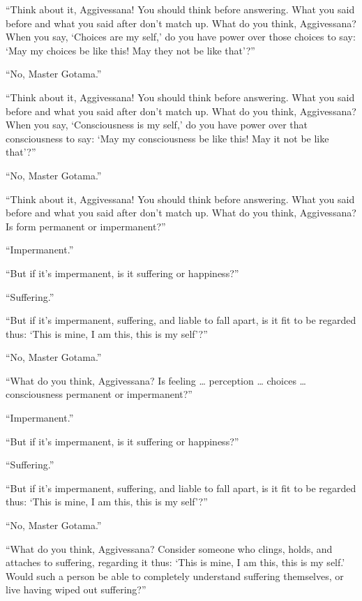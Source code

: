 \documentclass[12pt,openany]{book}%
\begin{document}
“Think about it, Aggivessana! You should think before answering. What you said before and what you said after don’t match up. What do you think, Aggivessana? When you say, ‘Choices are my self,’ do you have power over those choices to say: ‘May my choices be like this! May they not be like that’?” 

“No, Master Gotama.” 

“Think about it, Aggivessana! You should think before answering. What you said before and what you said after don’t match up. What do you think, Aggivessana? When you say, ‘Consciousness is my self,’ do you have power over that consciousness to say: ‘May my consciousness be like this! May it not be like that’?” 

“No, Master Gotama.” 

“Think about it, Aggivessana! You should think before answering. What you said before and what you said after don’t match up. What do you think, Aggivessana? Is form permanent or impermanent?” 

“Impermanent.” 

“But if it’s impermanent, is it suffering or happiness?” 

“Suffering.” 

“But if it’s impermanent, suffering, and liable to fall apart, is it fit to be regarded thus: ‘This is mine, I am this, this is my self’?” 

“No, Master Gotama.” 

“What do you think, Aggivessana? Is feeling … perception … choices … consciousness permanent or impermanent?” 

“Impermanent.” 

“But if it’s impermanent, is it suffering or happiness?” 

“Suffering.” 

“But if it’s impermanent, suffering, and liable to fall apart, is it fit to be regarded thus: ‘This is mine, I am this, this is my self’?” 

“No, Master Gotama.” 

“What do you think, Aggivessana? Consider someone who clings, holds, and attaches to suffering, regarding it thus: ‘This is mine, I am this, this is my self.’ Would such a person be able to completely understand suffering themselves, or live having wiped out suffering?” 
\end{document}
